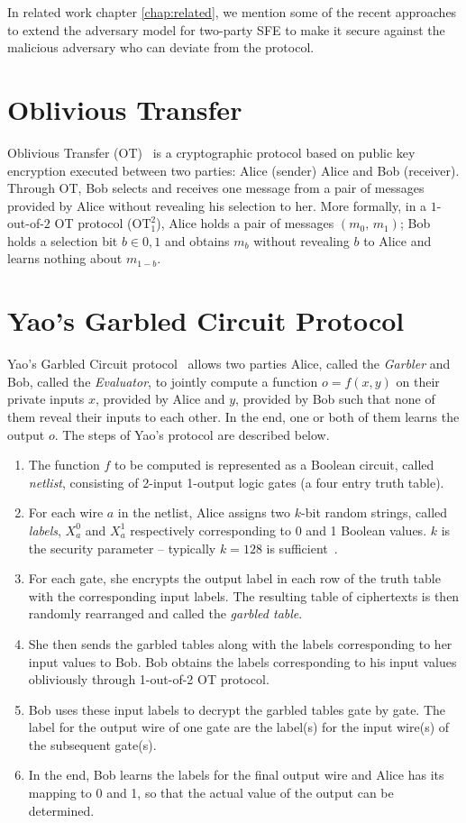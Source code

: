 In related work chapter \ref{chap:related}, we mention some of the recent approaches to extend the adversary model for two-party SFE to make it secure against the malicious adversary who can deviate from the protocol.

\section{Oblivious Transfer}\label{sect:prelim-OT}
Oblivious Transfer (OT)~\cite{NaorP05} is a cryptographic protocol based on public key encryption executed between two parties: Alice (sender) Alice and Bob (receiver).
Through OT, Bob selects and receives one message from a pair of messages provided by Alice without revealing his selection to her.
More formally, in a $1$-out-of-$2$ OT protocol ($\textrm{OT}^2_1$), Alice holds a pair of messages $(m_{0},\, m_{1})$; Bob holds a selection bit $b \in {0,1}$ and obtains $m_{b}$ without revealing $b$ to Alice and learns nothing about $m_{1-b}$.

\section{Yao's Garbled Circuit Protocol}\label{sect:prelim_gc}
Yao's Garbled Circuit protocol~\cite{Yao86} allows two parties Alice, called the \textit{Garbler} and Bob, called the \textit{Evaluator}, to jointly compute a function $o = f(x, y)$ on their private inputs $x$, provided by Alice and $y$, provided by Bob such that none of them reveal their inputs to each other.
In the end, one or both of them learns the output $o$.
The steps of Yao's protocol are described below.

\begin{enumerate}[label=\roman*.]
\item The function $f$ to be computed is represented as a Boolean circuit, called \textit{netlist}, consisting of 2-input 1-output logic gates (a four entry truth table).
\item For each wire $a$ in the netlist, Alice assigns two $k$-bit random strings, called \textit{labels}, $X_a^{0}$ and $X_a^{1}$ respectively corresponding to 0 and 1 Boolean values.
      $k$ is the security parameter -- typically $k=128$ is sufficient~\cite{bellare2013efficient}.
\item For each gate, she encrypts the output label in each row of the truth table with the corresponding input labels.
      The resulting table of ciphertexts is then randomly rearranged and called the \textit{garbled table}.
\item She then sends the garbled tables along with the labels corresponding to her input values to Bob.
      Bob obtains the labels corresponding to his input values obliviously through 1-out-of-2 OT protocol.
\item Bob uses these input labels to decrypt the garbled tables gate by gate.
      The label for the output wire of one gate are the label(s) for the input wire(s) of the subsequent gate(s).
\item In the end, Bob learns the labels for the final output wire and Alice has its mapping to 0 and 1, so that the actual value of the output can be determined.
\end{enumerate}

